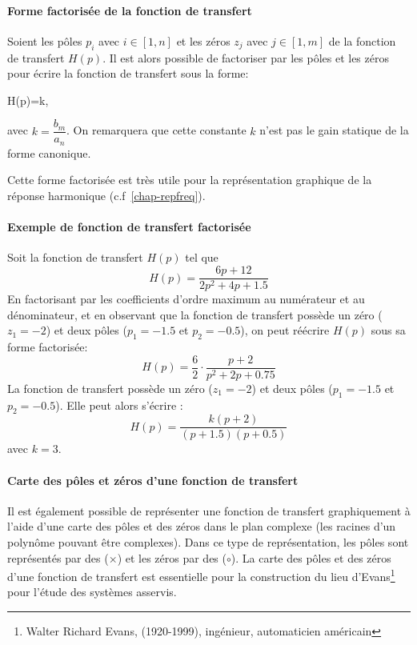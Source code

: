 \paragraph{Forme factorisée de la fonction de transfert}
Soient les pôles $p_i$ avec $i\in[1,n]$ et les zéros $z_j$ 
avec $j\in[1,m]$ de la fonction de transfert $H(p)$. 
Il est alors possible de factoriser par les pôles et les zéros pour 
écrire la fonction de transfert sous la forme:
\begin{bequation}
H(p)=k\cdot{},
\end{bequation}
avec $k=\dfrac{b_m}{a_n}$. On remarquera que cette constante $k$ 
n'est pas le gain statique de la forme canonique.

Cette forme factorisée est très utile pour la représentation graphique
de la réponse harmonique (c.f~\cref{chap-repfreq}).

\paragraph{Exemple de fonction de transfert factorisée}

Soit la fonction de transfert $H(p)$ tel que
$$
H(p)=\dfrac{6p+12}{2p^2+4p+1.5}	
$$
En factorisant par les coefficients d'ordre maximum au numérateur et 
au dénominateur, et en observant que la fonction de transfert possède un 
zéro ($z_1=-2$) et deux pôles ($p_1=-1.5$ et $p_2=-0.5$), 
on peut réécrire $H(p)$ sous sa forme factorisée:
$$
H(p)=\dfrac{6}{2}\cdot\dfrac{p+2}{p^2+2p+0.75}
$$
La fonction de transfert possède un zéro ($z_1=-2$) et deux pôles 
($p_1=-1.5$ et $p_2=-0.5$). Elle peut alors s'écrire :
$$
H(p)=\dfrac{k(p+2)}{(p+1.5)(p+0.5)}
$$
avec $k=3$.
	
\paragraph{Carte des pôles et zéros d'une fonction de transfert}

Il est également possible de représenter une fonction de transfert 
graphiquement à l'aide d'une carte des pôles et des zéros dans le plan complexe 
(les racines d'un polynôme pouvant être complexes). Dans ce type 
de représentation, les pôles sont représentés par des ($\times$) 
et les zéros par des ($\circ$). La carte des pôles et des zéros 
d'une fonction de transfert est essentielle pour la construction du 
lieu d'Evans\footnote{Walter Richard Evans, (1920-1999), 
ingénieur, automaticien américain} pour l'étude des systèmes asservis.

